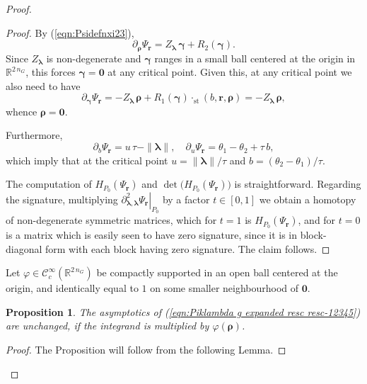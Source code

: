 \documentclass[12pt,a4paper]{article}
\theoremstyle{plain}
\newtheorem{prop}[thm]{Proposition}%
\theoremstyle{definition}
\begin{document}
\begin{proof}
\begin{proof}
By (\ref{eqn:Psidefnxi23}), 
\begin{equation}
\label{eqn:xi derv}
\partial_{\boldsymbol{\rho}}
\Psi_{\mathbf{r}}=Z_{\boldsymbol{\lambda}}\,
\boldsymbol{\gamma}+R_2(\boldsymbol{\gamma}).
\end{equation}
%
Since 
$Z_{\boldsymbol{\lambda}}$ is non-degenerate and
$\boldsymbol{\gamma}$ ranges in 
a small ball centered at the origin in $\mathbb{R}^{2\,n_G}$,
this forces $\boldsymbol{\gamma}=\mathbf{0}$ at any critical
point.
Given this, at any critical point we also need to have
$$
\partial_{\boldsymbol{\gamma}}\Psi_{\mathbf{r}}=-Z_{\boldsymbol{\lambda}}\,
\boldsymbol{\rho}+R_1(\boldsymbol{\gamma})\cdot_{\mathrm{st}}
(b,\mathbf{r},\boldsymbol{\rho})
=-Z_{\boldsymbol{\lambda}}\,
\boldsymbol{\rho} ,
$$
whence $\boldsymbol{\rho}=\mathbf{0}$.

Furthermore, 
$$
\partial_{b}\Psi_{\mathbf{r}}=u\,\tau-\|\boldsymbol{\lambda}\|,
\quad \partial_{u}\Psi_{\mathbf{r}}=\theta_1-\theta_2
+\tau\,b,
$$
which imply that at the critical point $u=\|\boldsymbol{\lambda}\|/\tau$ and
$b=(\theta_2-\theta_1)/\tau$.

The computation of $H_{P_0}(\Psi_{\mathbf{r}})$ and 
$\det \big(H_{P_0}(\Psi_{\mathbf{r}})\big)$ is straightforward.
Regarding the signature, multiplying $\left.
\partial_{\boldsymbol{\lambda},\boldsymbol{\lambda}}^2
\Psi_{\mathbf{r}}\right|_{P_0}$ by a factor $t\in [0,1]$
we obtain a homotopy of non-degenerate symmetric matrices,
which for $t=1$ is $H_{P_0}(\Psi_{\mathbf{r}})$, and
for $t=0$ is a matrix which is easily seen to have 
zero signature, since it is in block-diagonal form 
with each block having zero signature. 
The claim follows.

\end{proof}

Let $\varphi\in 
\mathcal{C}^\infty_c\left(\mathbb{R}^{2\,n_G}\right)$
be compactly supported in an open ball centered at the origin,
and identically equal to $1$ on some smaller neighbourhood
of $\mathbf{0}$. 

\begin{prop}
\label{prop:rho comp supp}
The asymptotics of (\ref{eqn:Piklambda g expanded resc resc-12345}) are unchanged, if the integrand is 
multiplied by $\varphi(\boldsymbol{\rho})$.
\end{prop}

\begin{proof} The Proposition will follow from
the following Lemma.


\end{proof}
\end{proof}
\end{document}

